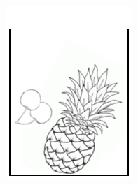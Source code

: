 \begin{figure}[!htb]
\begin{subfigure}{.30\linewidth}
        \includegraphics[width=\linewidth]{img/FreezeD.png}
    \end{subfigure}
    ~ 
    \begin{subfigure}{.30\linewidth}
        \centering

\end{subfigure}
\end{figure}
